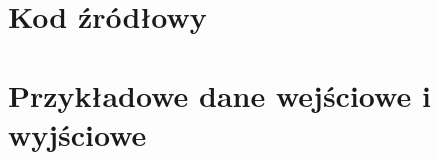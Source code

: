 \documentclass[12pt,a4paper]{article}
\begin{document}
\appendix
\section{Kod źródłowy}

\section{Przykładowe dane wejściowe i wyjściowe}
\end{document}
